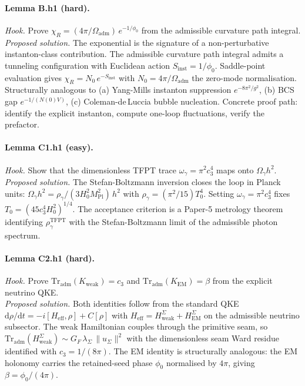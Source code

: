 \paragraph{Lemma B.h1 (hard).}
\emph{Hook.}  Prove
\(\chi_R=(4\pi/\Omega_{\mathrm{adm}})\,e^{-1/\phi_0}\) from the
admissible curvature path integral.\\
\emph{Proposed solution.}  The exponential is the signature of a
non-perturbative instanton-class contribution.  The admissible
curvature path integral admits a tunneling configuration with
Euclidean action \(S_{\mathrm{inst}}=1/\phi_0\).  Saddle-point
evaluation gives \(\chi_R = N_0\,e^{-S_{\mathrm{inst}}}\) with
\(N_0=4\pi/\Omega_{\mathrm{adm}}\) the zero-mode normalisation.
Structurally analogous to (a) Yang-Mills instanton suppression
\(e^{-8\pi^2/g^2}\), (b) BCS gap \(e^{-1/(N(0)V)}\), (c)
Coleman-de\,Luccia bubble nucleation.  Concrete proof path: identify
the explicit instanton, compute one-loop fluctuations, verify the
prefactor.

\paragraph{Lemma C1.h1 (easy).}
\emph{Hook.}  Show that the dimensionless TFPT trace
\(\omega_\gamma=\pi^2 c_3^4\) maps onto \(\Omega_\gamma h^2\).\\
\emph{Proposed solution.}  The Stefan-Boltzmann inversion closes the
loop in Planck units: \(\Omega_\gamma h^2 = \rho_\gamma/(3 H_0^2 M_{\mathrm{Pl}}^2)\,h^2\) with \(\rho_\gamma=(\pi^2/15)T_0^4\).  Setting
\(\omega_\gamma=\pi^2 c_3^4\) fixes
\(T_0=(45 c_3^4 H_0^2)^{1/4}\).  The acceptance criterion is a
Paper-5 metrology theorem identifying \(\rho_\gamma^{\mathrm{TFPT}}\)
with the Stefan-Boltzmann limit of the admissible photon spectrum.

\paragraph{Lemma C2.h1 (hard).}
\emph{Hook.}  Prove
\(\mathrm{Tr}_{\mathrm{adm}}(K_{\mathrm{weak}})=c_3\) and
\(\mathrm{Tr}_{\mathrm{adm}}(K_{\mathrm{EM}})=\beta\) from the
explicit neutrino QKE.\\
\emph{Proposed solution.}  Both identities follow from the standard
QKE \(\mathrm d\rho/\mathrm dt = -i[H_{\mathrm{eff}},\rho]+C[\rho]\)
with \(H_{\mathrm{eff}}=H_{\mathrm{weak}}^\Sigma+H_{\mathrm{EM}}^\Sigma\)
on the admissible neutrino subsector.  The weak Hamiltonian couples
through the primitive seam, so
\(\mathrm{Tr}_{\mathrm{adm}}(H_{\mathrm{weak}}^\Sigma)
\sim G_F\,\lambda_\Sigma\,\|u_\Sigma\|^2\) with the dimensionless
seam Ward residue identified with \(c_3=1/(8\pi)\).  The EM identity
is structurally analogous: the EM holonomy carries the retained-seed
phase \(\phi_0\) normalised by \(4\pi\), giving \(\beta=\phi_0/(4\pi)\).

